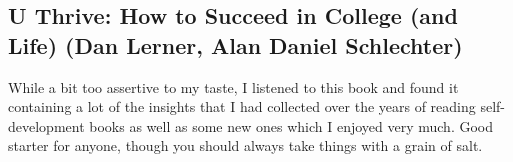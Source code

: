 \subsection{U Thrive: How to Succeed in College (and Life) (Dan Lerner, Alan Daniel Schlechter)}

While a bit too assertive to my taste, I listened to this book and found it containing a lot of the insights that I had collected over the years of reading self-development books as well as some new ones which I enjoyed very much. Good starter for anyone, though you should always take things with a grain of salt.